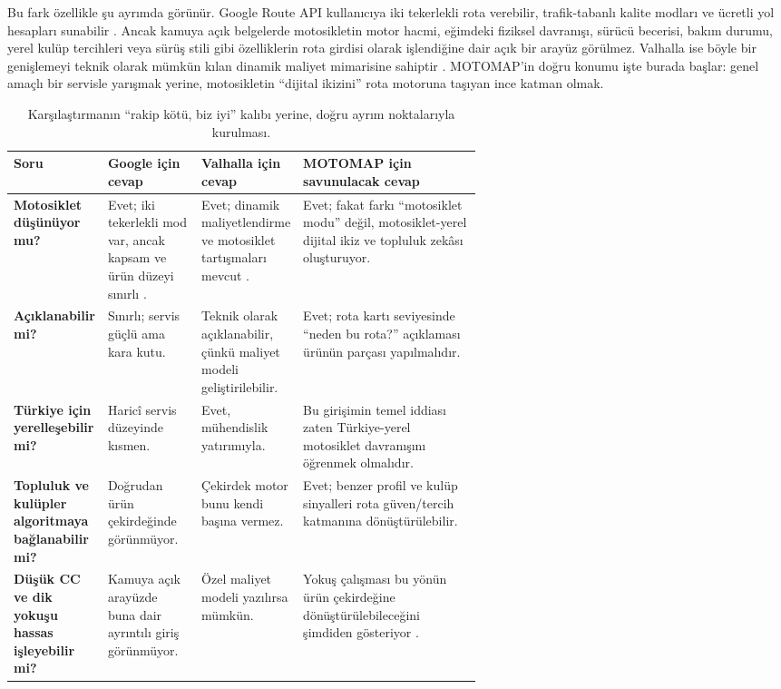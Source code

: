 \documentclass[11pt,a4paper]{article}
\begin{document}
Bu fark özellikle şu ayrımda görünür. Google Route API kullanıcıya iki tekerlekli rota verebilir, trafik-tabanlı kalite modları ve ücretli yol hesapları sunabilir \cite{o1,o4,o5,o6}. Ancak kamuya açık belgelerde motosikletin motor hacmi, eğimdeki fiziksel davranışı, sürücü becerisi, bakım durumu, yerel kulüp tercihleri veya sürüş stili gibi özelliklerin rota girdisi olarak işlendiğine dair açık bir arayüz görülmez. Valhalla ise böyle bir genişlemeyi teknik olarak mümkün kılan dinamik maliyet mimarisine sahiptir \cite{o8,o9}. MOTOMAP'in doğru konumu işte burada başlar: genel amaçlı bir servisle yarışmak yerine, motosikletin ``dijital ikizini'' rota motoruna taşıyan ince katman olmak.

\begin{table}[htbp]
\centering
\small
{}
\begin{tabularx}{\linewidth}{>{\bfseries}p{0.2\linewidth}p{0.2\linewidth}p{0.2\linewidth}Y}
\toprule
Soru & Google için cevap & Valhalla için cevap & MOTOMAP için savunulacak cevap \\
\midrule
Motosiklet düşünüyor mu? & Evet; iki tekerlekli mod var, ancak kapsam ve ürün düzeyi sınırlı \cite{o1,o2,o3}. & Evet; dinamik maliyetlendirme ve motosiklet tartışmaları mevcut \cite{o8,o13}. & Evet; fakat farkı ``motosiklet modu'' değil, motosiklet-yerel dijital ikiz ve topluluk zekâsı oluşturuyor. \\
Açıklanabilir mi? & Sınırlı; servis güçlü ama kara kutu. & Teknik olarak açıklanabilir, çünkü maliyet modeli geliştirilebilir. & Evet; rota kartı seviyesinde ``neden bu rota?'' açıklaması ürünün parçası yapılmalıdır. \\
Türkiye için yerelleşebilir mi? & Haricî servis düzeyinde kısmen. & Evet, mühendislik yatırımıyla. & Bu girişimin temel iddiası zaten Türkiye-yerel motosiklet davranışını öğrenmek olmalıdır. \\
Topluluk ve kulüpler algoritmaya bağlanabilir mi? & Doğrudan ürün çekirdeğinde görünmüyor. & Çekirdek motor bunu kendi başına vermez. & Evet; benzer profil ve kulüp sinyalleri rota güven/tercih katmanına dönüştürülebilir. \\
Düşük CC ve dik yokuşu hassas işleyebilir mi? & Kamuya açık arayüzde buna dair ayrıntılı giriş görünmüyor. & Özel maliyet modeli yazılırsa mümkün. & Yokuş çalışması bu yönün ürün çekirdeğine dönüştürülebileceğini şimdiden gösteriyor \cite{u2}. \\
\bottomrule
\end{tabularx}
\caption{Karşılaştırmanın ``rakip kötü, biz iyi'' kalıbı yerine, doğru ayrım noktalarıyla kurulması.}
\end{table}
\end{document}
